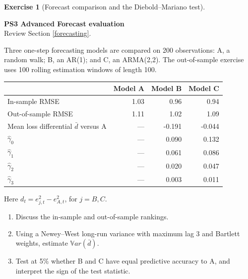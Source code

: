 \documentclass[
  11pt,
]{book}
\theoremstyle{definition}
\theoremstyle{definition}
\theoremstyle{definition}
\newtheorem{exercise}{Exercise}[chapter]
\theoremstyle{definition}
\theoremstyle{remark}
\begin{document}

\begin{exercisebox}

\begin{exercise}[Forecast comparison and the Diebold–Mariano test]
\protect\hypertarget{exr:ex-forecast-performance}{}\label{exr:ex-forecast-performance}

\textbf{PS3 \textbar{} Advanced \textbar{} Forecast evaluation}\\
Review Section \ref{forecasting}.

Three one-step forecasting models are compared on 200 observations: A, a random walk; B, an AR(1); and C, an ARMA(2,2). The out-of-sample exercise uses 100 rolling estimation windows of length 100.

\begin{longtable}[]{@{}lrrr@{}}
\toprule\noalign{}
& Model A & Model B & Model C \\
\midrule\noalign{}
\endhead
\bottomrule\noalign{}
\endlastfoot
In-sample RMSE & 1.03 & 0.96 & 0.94 \\
Out-of-sample RMSE & 1.11 & 1.02 & 1.09 \\
Mean loss differential \(\bar d\) versus A & --- & -0.191 & -0.044 \\
\(\hat\gamma_0\) & --- & 0.090 & 0.132 \\
\(\hat\gamma_1\) & --- & 0.061 & 0.086 \\
\(\hat\gamma_2\) & --- & 0.020 & 0.047 \\
\(\hat\gamma_3\) & --- & 0.003 & 0.011 \\
\end{longtable}

Here \(d_t=e_{j,t}^2-e_{A,t}^2\), for \(j=B,C\).

\begin{enumerate}
\def\labelenumi{\arabic{enumi}.}
\item
  Discuss the in-sample and out-of-sample rankings.
\item
  Using a Newey--West long-run variance with maximum lag 3 and Bartlett weights, estimate \(\mathbb{V}ar(\bar d)\).
\item
  Test at 5\% whether B and C have equal predictive accuracy to A, and interpret the sign of the test statistic.
\end{enumerate}

\end{exercise}

\end{exercisebox}
\end{document}
